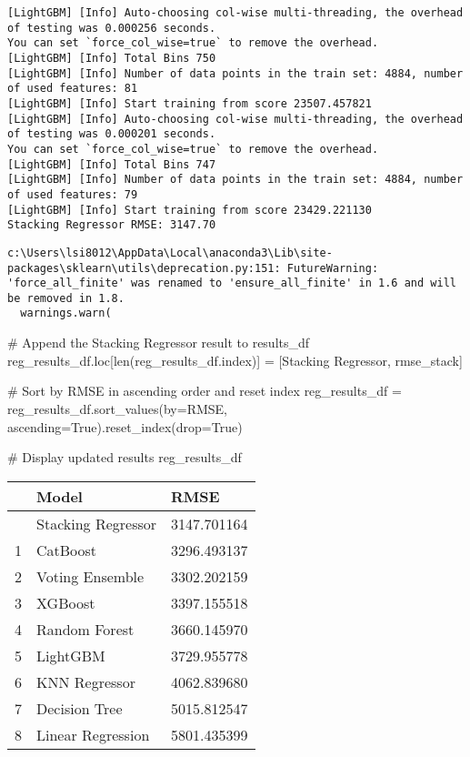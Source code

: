 \documentclass[
  letterpaper,
  DIV=11,
  numbers=noendperiod]{scrreprt}
\newenvironment{Shaded}{\begin{snugshade}}{\end{snugshade}}
\newcommand{\BuiltInTok}[1]{\textcolor[rgb]{0.00,0.23,0.31}{#1}}
\newcommand{\CommentTok}[1]{\textcolor[rgb]{0.37,0.37,0.37}{#1}}
\newcommand{\NormalTok}[1]{\textcolor[rgb]{0.00,0.23,0.31}{#1}}
\newcommand{\OperatorTok}[1]{\textcolor[rgb]{0.37,0.37,0.37}{#1}}
\newcommand{\StringTok}[1]{\textcolor[rgb]{0.13,0.47,0.30}{#1}}
\newcommand{\VariableTok}[1]{\textcolor[rgb]{0.07,0.07,0.07}{#1}}
\begin{document}
\begin{verbatim}
[LightGBM] [Info] Auto-choosing col-wise multi-threading, the overhead of testing was 0.000256 seconds.
You can set `force_col_wise=true` to remove the overhead.
[LightGBM] [Info] Total Bins 750
[LightGBM] [Info] Number of data points in the train set: 4884, number of used features: 81
[LightGBM] [Info] Start training from score 23507.457821
[LightGBM] [Info] Auto-choosing col-wise multi-threading, the overhead of testing was 0.000201 seconds.
You can set `force_col_wise=true` to remove the overhead.
[LightGBM] [Info] Total Bins 747
[LightGBM] [Info] Number of data points in the train set: 4884, number of used features: 79
[LightGBM] [Info] Start training from score 23429.221130
Stacking Regressor RMSE: 3147.70
\end{verbatim}

\begin{verbatim}
c:\Users\lsi8012\AppData\Local\anaconda3\Lib\site-packages\sklearn\utils\deprecation.py:151: FutureWarning: 'force_all_finite' was renamed to 'ensure_all_finite' in 1.6 and will be removed in 1.8.
  warnings.warn(
\end{verbatim}

\begin{Shaded}
\begin{Highlighting}[]
\CommentTok{\# Append the Stacking Regressor result to results\_df}
\NormalTok{reg\_results\_df.loc[}\BuiltInTok{len}\NormalTok{(reg\_results\_df.index)] }\OperatorTok{=}\NormalTok{ [}\StringTok{\textquotesingle{}Stacking Regressor\textquotesingle{}}\NormalTok{, rmse\_stack]}

\CommentTok{\# Sort by RMSE in ascending order and reset index}
\NormalTok{reg\_results\_df }\OperatorTok{=}\NormalTok{ reg\_results\_df.sort\_values(by}\OperatorTok{=}\StringTok{\textquotesingle{}RMSE\textquotesingle{}}\NormalTok{, ascending}\OperatorTok{=}\VariableTok{True}\NormalTok{).reset\_index(drop}\OperatorTok{=}\VariableTok{True}\NormalTok{)}

\CommentTok{\# Display updated results}
\NormalTok{reg\_results\_df}
\end{Highlighting}
\end{Shaded}

\begin{longtable}[]{@{}lll@{}}
\toprule\noalign{}
& Model & RMSE \\
\midrule\noalign{}
\endhead
\bottomrule\noalign{}
\endlastfoot
0 & Stacking Regressor & 3147.701164 \\
1 & CatBoost & 3296.493137 \\
2 & Voting Ensemble & 3302.202159 \\
3 & XGBoost & 3397.155518 \\
4 & Random Forest & 3660.145970 \\
5 & LightGBM & 3729.955778 \\
6 & KNN Regressor & 4062.839680 \\
7 & Decision Tree & 5015.812547 \\
8 & Linear Regression & 5801.435399 \\
\end{longtable}
\end{document}
